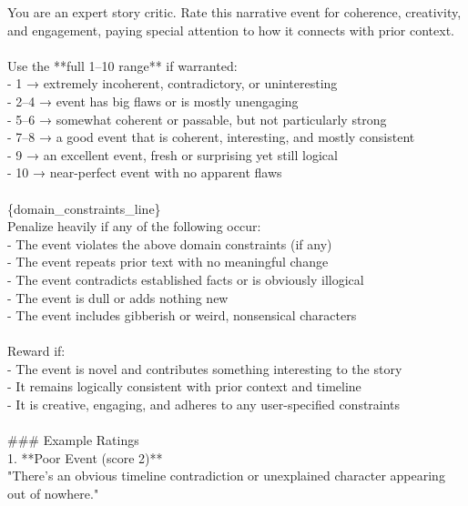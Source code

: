 \documentclass[11pt]{article}
\begin{document}
\begin{small}
\begin{tcolorbox}[colback=gray!10, colframe=gray!40, arc=4mm, boxrule=0pt]
You are an expert story critic. Rate this narrative event for coherence, creativity, and engagement, paying special attention to how it connects with prior context.\\
\\
Use the **full 1–10 range** if warranted:\\
  - 1 → extremely incoherent, contradictory, or uninteresting\\
  - 2–4 → event has big flaws or is mostly unengaging\\
  - 5–6 → somewhat coherent or passable, but not particularly strong\\
  - 7–8 → a good event that is coherent, interesting, and mostly consistent\\
  - 9 → an excellent event, fresh or surprising yet still logical\\
  - 10 → near-perfect event with no apparent flaws\\
\\
\{domain\_constraints\_line\}\\
Penalize heavily if any of the following occur:\\
  - The event violates the above domain constraints (if any) \\
  - The event repeats prior text with no meaningful change \\
  - The event contradicts established facts or is obviously illogical \\
  - The event is dull or adds nothing new \\
  - The event includes gibberish or weird, nonsensical characters \\
\\
Reward if: \\
  - The event is novel and contributes something interesting to the story \\
  - It remains logically consistent with prior context and timeline \\
  - It is creative, engaging, and adheres to any user-specified constraints \\
\\
### Example Ratings\\
1. **Poor Event (score 2)**\\
   "There's an obvious timeline contradiction or unexplained character appearing out of nowhere."\\

\end{tcolorbox}
\end{small}
\end{document}
